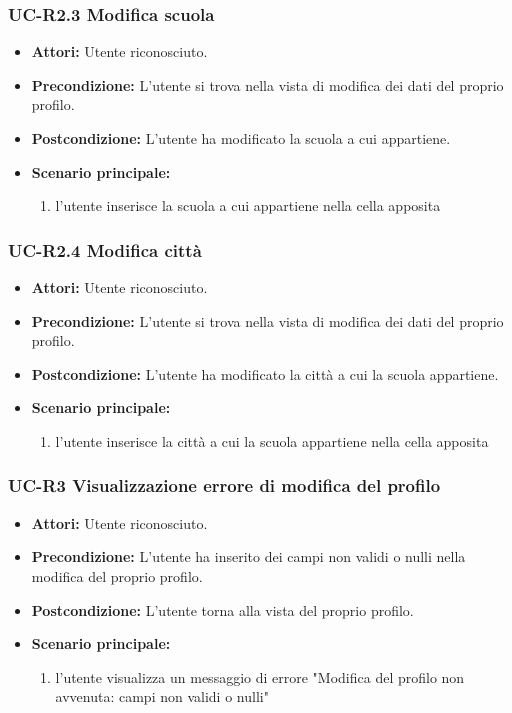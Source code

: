 \subsubsection{UC-R2.3 Modifica scuola}
\begin{itemize}
			\item \textbf{Attori:} Utente riconosciuto.
			\item \textbf{Precondizione:} L'utente si trova nella vista di modifica dei dati del proprio profilo.
			\item \textbf{Postcondizione:} L'utente ha modificato la scuola a cui appartiene.
			\item \textbf{Scenario principale:}
			\begin{enumerate}
				\item l'utente inserisce la scuola a cui appartiene nella cella apposita
			\end{enumerate}
\end{itemize}

\subsubsection{UC-R2.4 Modifica città}
\begin{itemize}
			\item \textbf{Attori:} Utente riconosciuto.
			\item \textbf{Precondizione:} L'utente si trova nella vista di modifica dei dati del proprio profilo.
			\item \textbf{Postcondizione:} L'utente ha modificato la città a cui la scuola appartiene.
			\item \textbf{Scenario principale:}
			\begin{enumerate}
				\item l'utente inserisce la città a cui la scuola appartiene nella cella apposita
			\end{enumerate}
\end{itemize}

\subsubsection{UC-R3 Visualizzazione errore di modifica del profilo}	
	\begin{itemize}
		\item \textbf{Attori:} Utente riconosciuto.
		\item \textbf{Precondizione:} L'utente ha inserito dei campi non validi o nulli nella modifica del proprio profilo.
		\item \textbf{Postcondizione:} L'utente torna alla vista del proprio profilo.
		\item \textbf{Scenario principale:}
		\begin{enumerate}
			\item l'utente visualizza un messaggio di errore "Modifica del profilo non avvenuta: campi non validi o nulli"
		\end{enumerate}
	\end{itemize}


